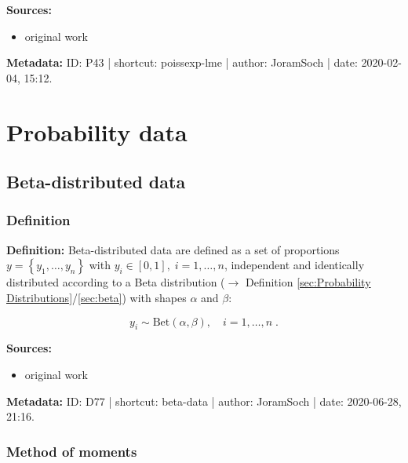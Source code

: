 \documentclass[a4paper,12pt,twoside]{book}
\begin{document}
\vspace{1em}
\textbf{Sources:}
\begin{itemize}
\item original work\end{itemize}


\vspace{1em}
\textbf{Metadata:} ID: P43 | shortcut: poissexp-lme | author: JoramSoch | date: 2020-02-04, 15:12.
\vspace{1em}



\pagebreak
\section{Probability data}

\subsection{Beta-distributed data}

\subsubsection[\textit{Definition}]{Definition} \label{sec:beta-data}
\setcounter{equation}{0}

\textbf{Definition:} Beta-distributed data are defined as a set of proportions $y = \left\lbrace y_1, \ldots, y_n \right\rbrace$ with $y_i \in [0,1], \; i = 1,\ldots,n$, independent and identically distributed according to a Beta distribution ($\rightarrow$ Definition \ref{sec:Probability Distributions}/\ref{sec:beta}) with shapes $\alpha$ and $\beta$:

\begin{equation} \label{eq:beta-data-beta-data}
y_i \sim \mathrm{Bet}(\alpha,\beta), \quad i = 1, \ldots, n \; .
\end{equation}


\vspace{1em}
\textbf{Sources:}
\begin{itemize}
\item original work\end{itemize}


\vspace{1em}
\textbf{Metadata:} ID: D77 | shortcut: beta-data | author: JoramSoch | date: 2020-06-28, 21:16.
\vspace{1em}



\subsubsection[\textbf{Method of moments}]{Method of moments} \label{sec:beta-mom}
\setcounter{equation}{0}
\end{document}
